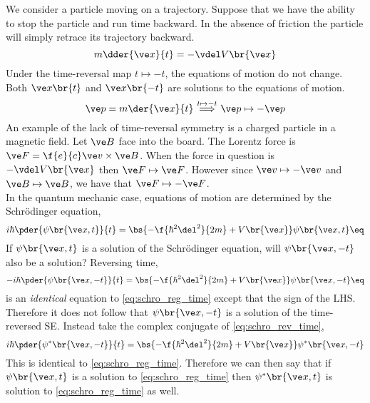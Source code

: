 \documentclass{article}
\begin{document}
We consider a particle moving on a trajectory. Suppose that we have the ability to stop the particle and run time backward. In the absence of friction the particle will simply retrace its trajectory backward.
\[ m \dder{\ve x}{t} = - \vdel V \br{\ve x} \]
Under the time-reversal map $t \mapsto -t$, the equations of motion do not change. Both $\ve x\br{t}$ and $\ve x\br{-t}$ are solutions to the equations of motion.
\[ \ve p = m \der{\ve x}{t} \stackrel{t \mapsto -t}{\implies} \ve p \mapsto - \ve p \]
An example of the lack of time-reversal symmetry is a charged particle in a magnetic field. Let $\ve B$ face into the board. The Lorentz force is $\ve F = \f{e}{c} \ve v \times \ve B$. When the force in question is $- \vdel V \br{\ve x}$ then $\ve F \mapsto \ve F$. However since $\ve v \mapsto -\ve v$ and $\ve B \mapsto \ve B$, we have that $\ve F \mapsto - \ve F$. \\

In the quantum mechanic case, equations of motion are determined by the Schrödinger equation,
\[ i \hbar \pder{\psi\br{\ve x, t}}{t} = \bs{-\f{\hbar^2 \del^2}{2m} + V \br{\ve x}} \psi \br{\ve x, t} \eq \label{eq:schro_reg_time}\]
If $\psi \br{\ve x, t}$ is a solution of the Schrödinger equation, will $\psi \br{\ve x, -t}$ also be a solution? Reversing time,
\[ -i \hbar \pder{\psi\br{\ve x, -t}}{t} = \bs{-\f{\hbar^2 \del^2}{2m} + V \br{\ve x}} \psi \br{\ve x, -t} \eq \label{eq:schro_rev_time}\]
 is an \textit{identical} equation to \cref{eq:schro_reg_time} except that the sign of the LHS. Therefore it does not follow that $\psi\br{\ve x, - t}$ is a solution of the time-reversed SE. Instead take the complex conjugate of \cref{eq:schro_rev_time},
\[ i \hbar \pder{\psi^*\br{\ve x, -t}}{t} = \bs{-\f{\hbar^2 \del^2}{2m} + V \br{\ve x}} \psi^* \br{\ve x, -t} \]
This is identical to \cref{eq:schro_reg_time}. Therefore we can then say that if $\psi\br{\ve x, t}$ is a solution to \cref{eq:schro_reg_time} then $\psi^*\br{\ve x, t}$ is solution to \cref{eq:schro_reg_time} as well. \\
\end{document}
